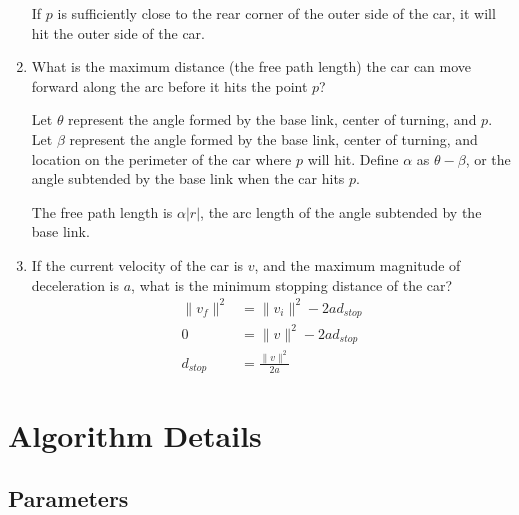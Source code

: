 \documentclass[11pt]{article}
\begin{document}
\begin{enumerate}[leftmargin=*]
    If $p$ is sufficiently close to the rear corner of the outer side of the
    car, it will hit the outer side of the car.


    \item
    What is the maximum distance (the free path length) the car can move forward
    along the arc before it hits the point $p$?

    Let $\theta$ represent the angle formed by the base link, center of turning,
    and $p$.
    Let $\beta$ represent the angle formed by the base link, center of turning,
    and location on the perimeter of the car where $p$ will hit.  Define
    $\alpha$ as $\theta - \beta$, or the angle subtended by the base link when
    the car hits $p$.

    The free path length is $\alpha \lvert r \rvert$, the arc length of the
    angle subtended by the base link.

    \item
    If the current velocity of the car is $v$, and the maximum magnitude of
    deceleration is $a$, what is the minimum stopping distance of the car?
    \begin{align*}
        \lVert v_f \rVert^2 &= \lVert v_i \rVert^2 - 2ad_{stop} \\
        0 &= \lVert v \rVert^2 - 2 a d_{stop} \\
        d_{stop} &= \frac{\lVert v \rVert^2}{2a}
    \end{align*}
\end{enumerate}

\section{Algorithm Details}

\subsection{Parameters}
\end{document}
